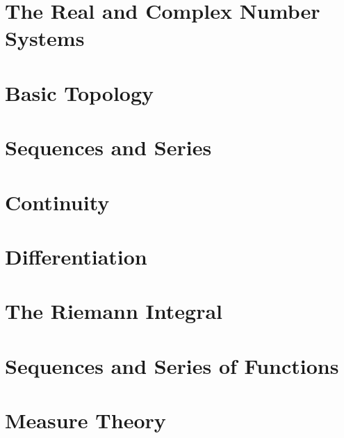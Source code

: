 \chapter{The Real and Complex Number Systems}


\chapter{Basic Topology}


\chapter{Sequences and Series}


\chapter{Continuity}


\chapter{Differentiation}


\chapter{The Riemann Integral}


\chapter{Sequences and Series of Functions}


\chapter{Measure Theory}
